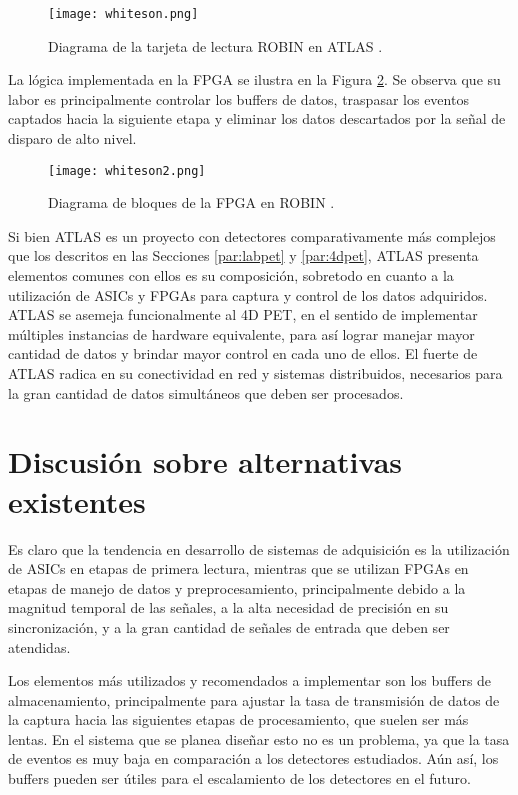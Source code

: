 	\begin{figure}[h]
		\centering
		\texttt{[image: whiteson.png]}
		\caption{Diagrama de la tarjeta de lectura ROBIN en ATLAS \cite{Whiteson2016TheSystem}.}
		\label{fig:whiteson}
	\end{figure}
	
	La lógica implementada en la FPGA se ilustra en la Figura \ref{fig:whiteson2}. Se observa que su labor es principalmente controlar los buffers de datos, traspasar los eventos captados hacia la siguiente etapa y eliminar los datos descartados por la señal de disparo de alto nivel.
	
	\begin{figure}[h]
		\centering
		\texttt{[image: whiteson2.png]}
		\caption{Diagrama de bloques de la FPGA en ROBIN \cite{Whiteson2016TheSystem}.}
		\label{fig:whiteson2}
	\end{figure}
	
	\newpage
	Si bien ATLAS es un proyecto con detectores comparativamente más complejos que los descritos en las Secciones \ref{par:labpet} y \ref{par:4dpet}, ATLAS presenta elementos comunes con ellos es su composición, sobretodo en cuanto a la utilización de ASICs y FPGAs para captura y control de los datos adquiridos. ATLAS se asemeja funcionalmente al 4D PET, en el sentido de implementar múltiples instancias de hardware equivalente, para así lograr manejar mayor cantidad de datos y brindar mayor control en cada uno de ellos. El fuerte de ATLAS radica en su conectividad en red y sistemas distribuidos, necesarios para la gran cantidad de datos simultáneos que deben ser procesados.


\section{Discusión sobre alternativas existentes}
	Es claro que la tendencia en desarrollo de sistemas de adquisición es la utilización de ASICs en etapas de primera lectura, mientras que se utilizan FPGAs en etapas de manejo de datos y preprocesamiento, principalmente debido a la magnitud temporal de las señales, a la alta necesidad de precisión en su sincronización, y a la gran cantidad de señales de entrada que deben ser atendidas.
	
	Los elementos más utilizados y recomendados a implementar son los buffers de almacenamiento, principalmente para ajustar la tasa de transmisión de datos de la captura hacia las siguientes etapas de procesamiento, que suelen ser más lentas. En el sistema que se planea diseñar esto no es un problema, ya que la tasa de eventos es muy baja en comparación a los detectores estudiados. Aún así, los buffers pueden ser útiles para el escalamiento de los detectores en el futuro.
	
